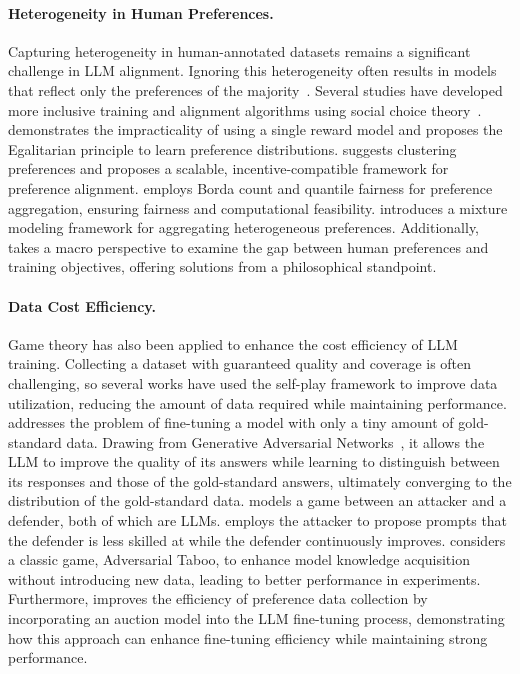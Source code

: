 \paragraph{Heterogeneity in Human Preferences.}
Capturing heterogeneity in human-annotated datasets remains a significant challenge in LLM alignment. Ignoring this heterogeneity often results in models that reflect only the preferences of the majority~\cite{fleisig2023majority}. Several studies have developed more inclusive training and alignment algorithms using social choice theory~\cite{chakraborty2024maxmin,park2024rlhf,alamdari2024policy,chen2024pal}.
\cite{chakraborty2024maxmin} demonstrates the impracticality of using a single reward model and proposes the Egalitarian principle to learn preference distributions. \cite{park2024rlhf} suggests clustering preferences and proposes a scalable, incentive-compatible framework for preference alignment. \cite{alamdari2024policy} employs Borda count and quantile fairness for preference aggregation, ensuring fairness and computational feasibility. \cite{chen2024pal} introduces a mixture modeling framework for aggregating heterogeneous preferences. Additionally, \cite{klingefjord2024human} takes a macro perspective to examine the gap between human preferences and training objectives, offering solutions from a philosophical standpoint.

\paragraph{Data Cost Efficiency.}
Game theory has also been applied to enhance the cost efficiency of LLM training. Collecting a dataset with guaranteed quality and coverage is often challenging, so several works have used the self-play framework to improve data utilization, reducing the amount of data required while maintaining performance. 
\cite{SPIN} addresses the problem of fine-tuning a model with only a tiny amount of gold-standard data.
Drawing from Generative Adversarial Networks~\cite{goodfellow2020generative}, it allows the LLM to improve the quality of its answers while learning to distinguish between its responses and those of the gold-standard answers, ultimately converging to the distribution of the gold-standard data. 
\cite{cheng2024self,alignmenttwoplayer} models a game between an attacker and a defender, both of which are LLMs. 
\cite{alignmenttwoplayer} employs the attacker to propose prompts that the defender is less skilled at while the defender continuously improves. 
\cite{cheng2024self} considers a classic game, Adversarial Taboo, to enhance model knowledge acquisition without introducing new data, leading to better performance in experiments. 
Furthermore, \cite{zhang2024vickreyfeedback} improves the efficiency of preference data collection by incorporating an auction model into the LLM fine-tuning process, demonstrating how this approach can enhance fine-tuning efficiency while maintaining strong performance.

